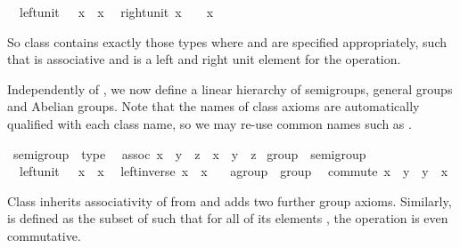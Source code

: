 \begin{isabellebody}
\ \ left{\isacharunderscore}unit{\isacharcolon}\ {\isachardoublequote}{\isasymone}\ {\isasymodot}\ x\ {\isacharequal}\ x{\isachardoublequote}\isanewline
\ \ right{\isacharunderscore}unit{\isacharcolon}\ {\isachardoublequote}x\ {\isasymodot}\ {\isasymone}\ {\isacharequal}\ x{\isachardoublequote}\isamarkupfalse%
%
\begin{isamarkuptext}%
\noindent So class  contains exactly those types
  \isa{{\isasymtau}} where \isa{{\isasymodot}\ {\isasymColon}\ {\isasymtau}\ {\isasymRightarrow}\ {\isasymtau}\ {\isasymRightarrow}\ {\isasymtau}} and \isa{{\isasymone}\ {\isasymColon}\ {\isasymtau}}
  are specified appropriately, such that \isa{{\isasymodot}} is associative and
  \isa{{\isasymone}} is a left and right unit element for the \isa{{\isasymodot}}
  operation.%
\end{isamarkuptext}%
\isamarkuptrue%
%
\begin{isamarkuptext}%
\medskip Independently of , we now define a linear
  hierarchy of semigroups, general groups and Abelian groups.  Note
  that the names of class axioms are automatically qualified with each
  class name, so we may re-use common names such as .%
\end{isamarkuptext}%
\isamarkuptrue%
\ semigroup\ {\isasymsubseteq}\ type\isanewline
\ \ assoc{\isacharcolon}\ {\isachardoublequote}{\isacharparenleft}x\ {\isasymodot}\ y{\isacharparenright}\ {\isasymodot}\ z\ {\isacharequal}\ x\ {\isasymodot}\ {\isacharparenleft}y\ {\isasymodot}\ z{\isacharparenright}{\isachardoublequote}\isanewline
\isanewline
\isamarkupfalse%
\ group\ {\isasymsubseteq}\ semigroup\isanewline
\ \ left{\isacharunderscore}unit{\isacharcolon}\ {\isachardoublequote}{\isasymone}\ {\isasymodot}\ x\ {\isacharequal}\ x{\isachardoublequote}\isanewline
\ \ left{\isacharunderscore}inverse{\isacharcolon}\ {\isachardoublequote}x{\isasyminv}\ {\isasymodot}\ x\ {\isacharequal}\ {\isasymone}{\isachardoublequote}\isanewline
\isanewline
\isamarkupfalse%
\ agroup\ {\isasymsubseteq}\ group\isanewline
\ \ commute{\isacharcolon}\ {\isachardoublequote}x\ {\isasymodot}\ y\ {\isacharequal}\ y\ {\isasymodot}\ x{\isachardoublequote}\isamarkupfalse%
%
\begin{isamarkuptext}%
\noindent Class  inherits associativity of \isa{{\isasymodot}}
  from  and adds two further group axioms. Similarly,
   is defined as the subset of  such that
  for all of its elements \isa{{\isasymtau}}, the operation \isa{{\isasymodot}\ {\isasymColon}\ {\isasymtau}\ {\isasymRightarrow}\ {\isasymtau}\ {\isasymRightarrow}\ {\isasymtau}} is even commutative.%

\end{isamarkuptext}
\end{isabellebody}
